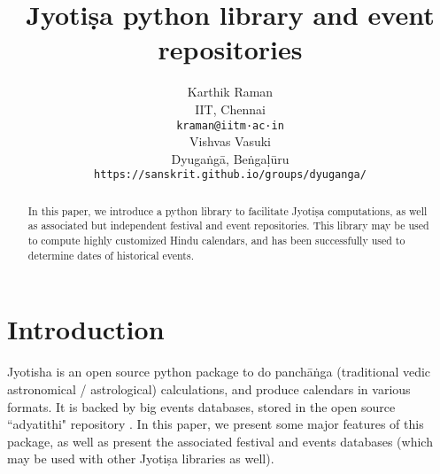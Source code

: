 \documentclass[11pt]{article}
\title{Jyotiṣa python library and event repositories}
\author{Karthik Raman \\
  IIT, Chennai \\
  {\tt kraman@iitm·ac·in} \\\And
  Vishvas Vasuki \\
  Dyugaṅgā, Beṅgaḷūru \\
  {\tt https://sanskrit.github.io/groups/dyuganga/}
\\}
\date{}
\begin{document}
\maketitle
\begin{abstract}
In this paper, we introduce a python library to facilitate Jyotiṣa computations, as well as associated but independent festival and event repositories. This library may be used to compute highly customized Hindu calendars, and has been successfully used to determine dates of historical events.
\end{abstract}

\section{Introduction}
Jyotisha \cite{jyotisha_py} is an open source python package to do panchāṅga (traditional vedic astronomical / astrological) calculations, and produce calendars in various formats. It is backed by big events databases, stored in the open source ``adyatithi" repository \cite{adyatithi}. In this paper, we present some major features of this package, as well as present the associated festival and events databases (which may be used with other Jyotiṣa libraries as well).





\end{document}
